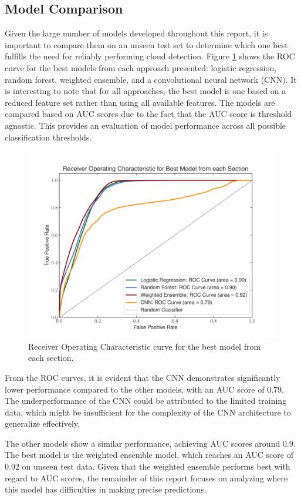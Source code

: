 \documentclass[11pt,letterpaper]{article}
\begin{document}
\subsection{Model Comparison}
Given the large number of models developed throughout this report, it is important to compare them on an unseen test set to determine which one best fulfills the need for reliably performing cloud detection. Figure \ref{fig_roc_all} shows the ROC curve for the best models from each approach presented: logistic regression, random forest, weighted ensemble, and a convolutional neural network (CNN). It is interesting to note that for all approaches, the best model is one based on a reduced feature set rather than using all available features. The models are compared based on AUC scores due to the fact that the AUC score is threshold agnostic. This provides an evaluation of model performance across all possible classification thresholds.

\begin{figure}[H]
    \centering
    \includegraphics[width=0.9\linewidth]{figs/roc_all_models.pdf}
    \caption{Receiver Operating Characteristic curve for the best model from each section.}
    \label{fig_roc_all}
\end{figure}

From the ROC curves, it is evident that the CNN demonstrates significantly lower performance compared to the other models, with an AUC score of 0.79. The underperformance of the CNN could be attributed to the limited training data, which might be insufficient for the complexity of the CNN architecture to generalize effectively.

The other models show a similar performance, achieving AUC scores around 0.9. The best model is the weighted ensemble model, which reaches an AUC score of 0.92 on unseen test data. Given that the weighted ensemble performs best with regard to AUC scores, the remainder of this report focuses on analyzing where this model has difficulties in making precise predictions.
\end{document}
